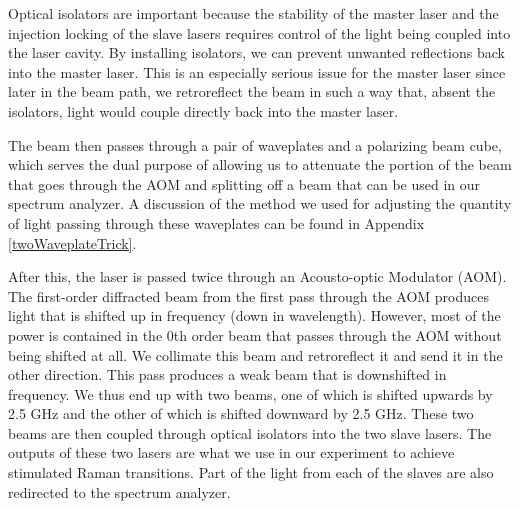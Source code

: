 Optical isolators are important because the stability of the master laser and the injection locking of the slave lasers requires control of the light being coupled into the laser cavity. By installing isolators, we can prevent unwanted reflections back into the master laser. This is an especially serious issue for the master laser since later in the beam path, we retroreflect the beam in such a way that, absent the isolators, light would couple directly back into the master laser. 

The beam then passes through a pair of waveplates and a polarizing beam cube, which serves the dual purpose of allowing us to attenuate the portion of the beam that goes through the AOM and splitting off a beam that can be used in our spectrum analyzer. A discussion of the method we used for adjusting the quantity of light passing through these waveplates can be found in Appendix \ref{twoWaveplateTrick}.

After this, the laser is passed twice through an Acousto-optic Modulator (AOM). The first-order diffracted beam from the first pass through the AOM produces light that is shifted up in frequency (down in wavelength). However, most of the power is contained in the 0th order beam that passes through the AOM without being shifted at all. We collimate this beam and retroreflect it and send it in the other direction. This pass produces a weak beam that is downshifted in frequency. We thus end up with two beams, one of which is shifted upwards by 2.5 GHz and the other of which is shifted downward by 2.5 GHz. These two beams are then coupled through optical isolators into the two slave lasers. The outputs of these two lasers are what we use in our experiment to achieve stimulated Raman transitions. Part of the light from each of the slaves are also redirected to the spectrum analyzer.


